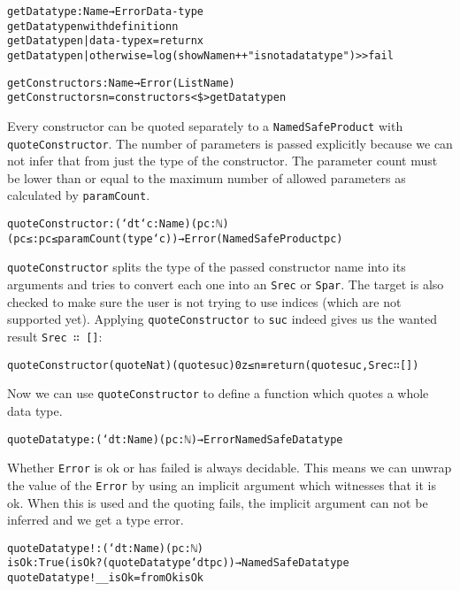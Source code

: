 \begin{alltt}
getDatatype : Name → Error Data-type
getDatatype n with definition n
getDatatype n | data-type x = return x
getDatatype n | otherwise = log (showName n ++ " is not a data type") >> fail

getConstructors : Name → Error (List Name)
getConstructors n = constructors <\$> getDatatype n
\end{alltt}

Every constructor can be quoted separately to a
\texttt{NamedSafeProduct} with \texttt{quoteConstructor}.
The number of parameters is passed explicitly because we can not infer
that from just the type of the constructor.
The parameter count must be lower than or equal to the maximum number
of allowed parameters as calculated by \texttt{paramCount}.

\begin{alltt}
quoteConstructor : (`dt `c : Name)(pc : ℕ)
  (pc≤ : pc ≤ paramCount (type `c)) → Error (NamedSafeProduct {pc})
\end{alltt}

\texttt{quoteConstructor} splits the type of the passed constructor
name into its arguments and tries to convert each one into an
\texttt{Srec} or \texttt{Spar}.
The target is also checked to make sure the user is not trying to use
indices (which are not supported yet).
Applying \texttt{quoteConstructor} to \texttt{suc} indeed gives us the
wanted result \texttt{Srec ∷ []}:

\begin{alltt}
quoteConstructor (quote Nat) (quote suc) 0 z≤n ≡ return (quote suc , Srec ∷ [])
\end{alltt}

Now we can use \texttt{quoteConstructor} to define a function which quotes
a whole data type.

\begin{alltt}
quoteDatatype : (`dt : Name)(pc : ℕ) → Error NamedSafeDatatype
\end{alltt}

Whether \texttt{Error} is ok or has failed is always decidable.
This means we can unwrap the value of the \texttt{Error} by using an
implicit argument which witnesses that it is ok.
When this is used and the quoting fails, the implicit argument can not
be inferred and we get a type error.

\begin{alltt}
quoteDatatype! : (`dt : Name) (pc : ℕ)
  {isOk : True (isOk? (quoteDatatype `dt pc))} → NamedSafeDatatype
quoteDatatype! _ _ {isOk} = fromOk isOk
\end{alltt}

